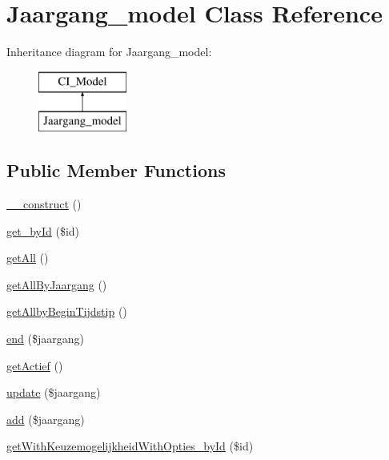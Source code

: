 \hypertarget{class_jaargang__model}{}\section{Jaargang\+\_\+model Class Reference}
\label{class_jaargang__model}
Inheritance diagram for Jaargang\+\_\+model\+:\begin{figure}[H]
\begin{center}
\leavevmode
\includegraphics[height=2.000000cm]{class_jaargang__model}
\end{center}
\end{figure}
\subsection*{Public Member Functions}
\begin{DoxyCompactItemize}
\item 
\mbox{\hyperlink{class_jaargang__model_a8556a042a80cea1a12445d8389c2e019}{\+\_\+\+\_\+construct}} ()
\item 
\mbox{\hyperlink{class_jaargang__model_a10cf39c5710240aec9aad633253e3048}{get\+\_\+by\+Id}} (\$id)
\item 
\mbox{\hyperlink{class_jaargang__model_a25674521a1a6a191c6cc77e524e5b8f5}{get\+All}} ()
\item 
\mbox{\hyperlink{class_jaargang__model_ab77c5c935c05d5bc08630111f3f0273f}{get\+All\+By\+Jaargang}} ()
\item 
\mbox{\hyperlink{class_jaargang__model_aba56cc05b3878d487d723edfe4464803}{get\+Allby\+Begin\+Tijdstip}} ()
\item 
\mbox{\hyperlink{class_jaargang__model_a56a8c0bc2beb0dca5ab28ca8d019d64e}{end}} (\$jaargang)
\item 
\mbox{\hyperlink{class_jaargang__model_a4e55f912a50eea5f66669fec3ae11f6d}{get\+Actief}} ()
\item 
\mbox{\hyperlink{class_jaargang__model_a18ab753f7cf3d830f513979cff49e2b8}{update}} (\$jaargang)
\item 
\mbox{\hyperlink{class_jaargang__model_a726ba676b9f198c0bf77191a66262421}{add}} (\$jaargang)
\item 
\mbox{\hyperlink{class_jaargang__model_a99ab50dc52b431939edc5db85b857bc6}{get\+With\+Keuzemogelijkheid\+With\+Opties\+\_\+by\+Id}} (\$id)
\end{DoxyCompactItemize}


